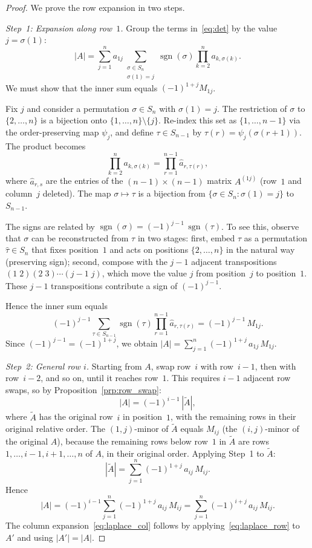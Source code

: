 \documentclass[14pt]{extarticle}
\theoremstyle{plain}
\theoremstyle{definition}
\theoremstyle{remark}
\begin{document}
\begin{proof}
We prove the row expansion in two steps.

\emph{Step~1: Expansion along row~$1$.}
Group the terms in~\eqref{eq:det} by the value $j = \sigma(1)$:
\[
|A| = \sum_{j=1}^{n} a_{1j} \sum_{\substack{\sigma \in S_n \\ \sigma(1)=j}} \operatorname{sgn}(\sigma) \prod_{k=2}^{n} a_{k,\sigma(k)}.
\]
We must show that the inner sum equals $(-1)^{1+j} M_{1j}$.

Fix $j$ and consider a permutation $\sigma \in S_n$ with $\sigma(1) = j$. The restriction of $\sigma$ to $\{2, \dots, n\}$ is a bijection onto $\{1, \dots, n\} \setminus \{j\}$. Re-index this set as $\{1, \dots, n-1\}$ via the order-preserving map $\psi_j$, and define $\tau \in S_{n-1}$ by $\tau(r) = \psi_j(\sigma(r+1))$. The product becomes
\[
\prod_{k=2}^{n} a_{k,\sigma(k)} = \prod_{r=1}^{n-1} \hat{a}_{r,\tau(r)},
\]
where $\hat{a}_{r,s}$ are the entries of the $(n-1) \times (n-1)$ matrix $A^{(1j)}$ (row~$1$ and column~$j$ deleted). The map $\sigma \mapsto \tau$ is a bijection from $\{\sigma \in S_n : \sigma(1) = j\}$ to $S_{n-1}$.

The signs are related by $\operatorname{sgn}(\sigma) = (-1)^{j-1}\, \operatorname{sgn}(\tau)$. To see this, observe that $\sigma$ can be reconstructed from $\tau$ in two stages: first, embed $\tau$ as a permutation $\hat{\tau} \in S_n$ that fixes position~$1$ and acts on positions $\{2, \dots, n\}$ in the natural way (preserving sign); second, compose with the $j-1$ adjacent transpositions $(1\;2)(2\;3)\cdots(j{-}1\;j)$, which move the value $j$ from position~$j$ to position~$1$. These $j - 1$ transpositions contribute a sign of $(-1)^{j-1}$.

Hence the inner sum equals
\[
(-1)^{j-1} \sum_{\tau \in S_{n-1}} \operatorname{sgn}(\tau) \prod_{r=1}^{n-1} \hat{a}_{r,\tau(r)} = (-1)^{j-1}\, M_{1j}.
\]
Since $(-1)^{j-1} = (-1)^{1+j}$, we obtain $|A| = \sum_{j=1}^{n} (-1)^{1+j}\, a_{1j}\, M_{1j}$.

\emph{Step~2: General row $i$.}
Starting from $A$, swap row~$i$ with row~$i-1$, then with row~$i-2$, and so on, until it reaches row~$1$. This requires $i - 1$ adjacent row swaps, so by Proposition~\ref{prp:row_swap}:
\[
|A| = (-1)^{i-1}\, |\tilde{A}|,
\]
where $\tilde{A}$ has the original row~$i$ in position~$1$, with the remaining rows in their original relative order. The $(1,j)$-minor of $\tilde{A}$ equals $M_{ij}$ (the $(i,j)$-minor of the original $A$), because the remaining rows below row~$1$ in $\tilde{A}$ are rows $1, \dots, i{-}1, i{+}1, \dots, n$ of $A$, in their original order. Applying Step~1 to $\tilde{A}$:
\[
|\tilde{A}| = \sum_{j=1}^{n} (-1)^{1+j}\, a_{ij}\, M_{ij}.
\]
Hence
\[
|A| = (-1)^{i-1} \sum_{j=1}^{n} (-1)^{1+j}\, a_{ij}\, M_{ij} = \sum_{j=1}^{n} (-1)^{i+j}\, a_{ij}\, M_{ij}.
\]
The column expansion~\eqref{eq:laplace_col} follows by applying~\eqref{eq:laplace_row} to $A'$ and using $|A'| = |A|$.
\end{proof}
\end{document}
